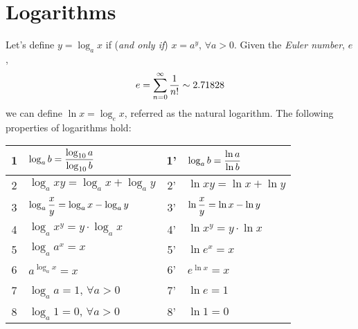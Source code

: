 \section{Logarithms}\label{Chapter:LogExpReview:Section:Log}
Let's define $y = \log_{a}x$ if ({\it and only if}) $x=a^{y}$, $\forall a>0$. Given the {\it Euler number}, $e$,
\begin{displaymath}
e = \sum\limits_{n=0}^{\infty}\displaystyle\frac{1}{n!}\sim 2.71828
\end{displaymath}
we can define $\ln x = \log_{e}{x}$, referred as the natural logarithm. The following properties of logarithms hold:
\begin{center}
  \begin{tabular}{||c l | c l||}
     \hline\hline
       1  & $\log_{a}b = \displaystyle\frac{\log_{10}{a}}{\log_{10}{b}}$ & 1' & $\log_{a}b = \displaystyle\frac{\ln{a}}{\ln{b}}$\\
     \hline
       2  & $\log_{a}{xy} = \log_{a}{x}+\log_{a}{y}$ & 2' &$\ln{xy} = \ln{x}+\ln{y}$  \\
     \hline
       3  & $\log_{a}{\displaystyle\frac{x}{y}} = \log_{a}{x}-\log_{a}{y}$ & 3' & $\ln{\displaystyle\frac{x}{y}} = \ln{x}-\ln{y}$ \\
     \hline
       4  & $\log_{a}{x^{y}} = y\cdot\log_{a}{x}$ & 4' & $\ln{x^{y}} = y\cdot\ln{x}$ \\
     \hline
       5  & $\log_{a}{a^{x}} = x$ & 5' & $\ln{e^{x}} = x$ \\
     \hline
       6  & $a^{\log_{a}{x}} = x$   & 6' & $e^{\ln{x}} = x$ \\
     \hline
       7  & $\log_{a}{a} = 1$, $\forall a>0$ & 7' & $\ln{e} = 1$ \\ 
     \hline
       8  & $\log_{a}1 = 0$, $\forall a > 0$ & 8' & $\ln{1} = 0$ \\
     \hline\hline
  \end{tabular}  
\end{center}
